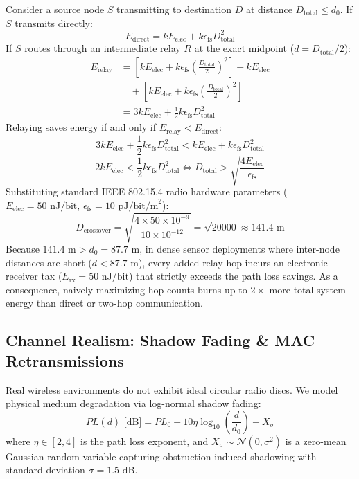 \documentclass[journal]{IEEEtran}
\begin{document}
Consider a source node $S$ transmitting to destination $D$ at distance $D_{\text{total}} \le d_0$. If $S$ transmits directly:
\begin{equation}
E_{\text{direct}} = k E_{\text{elec}} + k \epsilon_{\text{fs}} D_{\text{total}}^2
\end{equation}
If $S$ routes through an intermediate relay $R$ at the exact midpoint ($d = D_{\text{total}} / 2$):
\begin{align}
E_{\text{relay}} &= \left[ k E_{\text{elec}} + k \epsilon_{\text{fs}} \left( \frac{D_{\text{total}}}{2} \right)^2 \right] + k E_{\text{elec}} \nonumber \\
&\quad + \left[ k E_{\text{elec}} + k \epsilon_{\text{fs}} \left( \frac{D_{\text{total}}}{2} \right)^2 \right] \nonumber \\
&= 3 k E_{\text{elec}} + \frac{1}{2} k \epsilon_{\text{fs}} D_{\text{total}}^2
\end{align}
Relaying saves energy if and only if $E_{\text{relay}} < E_{\text{direct}}$:
\begin{equation}
3 k E_{\text{elec}} + \frac{1}{2} k \epsilon_{\text{fs}} D_{\text{total}}^2 < k E_{\text{elec}} + k \epsilon_{\text{fs}} D_{\text{total}}^2
\end{equation}
\begin{equation}
2 k E_{\text{elec}} < \frac{1}{2} k \epsilon_{\text{fs}} D_{\text{total}}^2 \iff D_{\text{total}} > \sqrt{\frac{4 E_{\text{elec}}}{\epsilon_{\text{fs}}}}
\label{eq:crossover_distance}
\end{equation}
Substituting standard IEEE 802.15.4 radio hardware parameters ($E_{\text{elec}} = 50\text{ nJ/bit}$, $\epsilon_{\text{fs}} = 10\text{ pJ/bit/m}^2$):
\begin{equation}
D_{\text{crossover}} = \sqrt{\frac{4 \times 50 \times 10^{-9}}{10 \times 10^{-12}}} = \sqrt{20000} \approx 141.4\text{ m}
\end{equation}
Because $141.4\text{ m} > d_0 = 87.7\text{ m}$, in dense sensor deployments where inter-node distances are short ($d < 87.7\text{ m}$), every added relay hop incurs an electronic receiver tax ($E_{\text{rx}} = 50\text{ nJ/bit}$) that strictly exceeds the path loss savings. As a consequence, naively maximizing hop counts burns up to $2\times$ more total system energy than direct or two-hop communication.

\subsection{Channel Realism: Shadow Fading \& MAC Retransmissions}
Real wireless environments do not exhibit ideal circular radio discs. We model physical medium degradation via log-normal shadow fading:
\begin{equation}
PL(d)\text{ [dB]} = PL_0 + 10 \eta \log_{10} \left( \frac{d}{d_0} \right) + X_\sigma
\end{equation}
where $\eta \in [2, 4]$ is the path loss exponent, and $X_\sigma \sim \mathcal{N}(0, \sigma^2)$ is a zero-mean Gaussian random variable capturing obstruction-induced shadowing with standard deviation $\sigma = 1.5\text{ dB}$.
\end{document}
